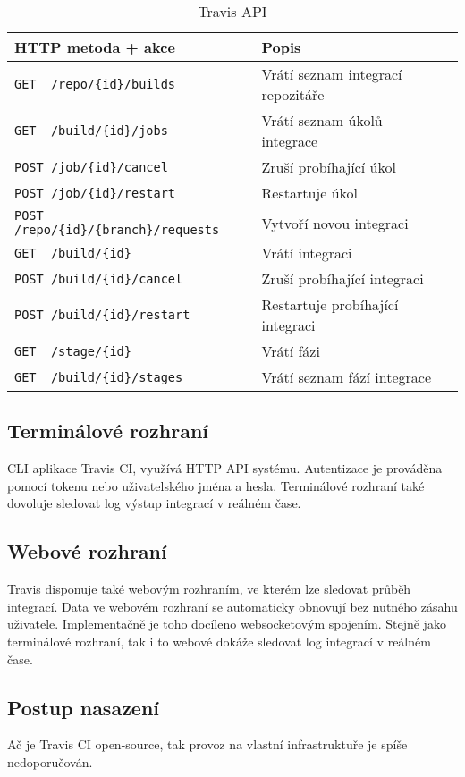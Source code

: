 \begin{table}[ht]
\centering
\fontsize{9.5}{11.5}\selectfont
\caption{Travis API}
\label{table:gitlab-api}
\begin{tabular}{|l|l|l|}
\hline
HTTP metoda + akce                                          & Popis \\ \hline
\verb|GET  /repo/{id}/builds|                               & Vrátí seznam integrací repozitáře      \\ \hline
\verb|GET  /build/{id}/jobs|                                & Vrátí seznam úkolů integrace      \\ \hline
\verb|POST /job/{id}/cancel|                                & Zruší probíhající úkol      \\ \hline
\verb|POST /job/{id}/restart|                               & Restartuje úkol      \\ \hline
\verb|POST /repo/{id}/{branch}/requests|                    & Vytvoří novou integraci      \\ \hline
\verb|GET  /build/{id}|                                     & Vrátí integraci      \\ \hline
\verb|POST /build/{id}/cancel|                              & Zruší probíhající integraci      \\ \hline
\verb|POST /build/{id}/restart|                             & Restartuje probíhající integraci      \\ \hline
\verb|GET  /stage/{id}|                                     & Vrátí fázi      \\ \hline
\verb|GET  /build/{id}/stages|                              & Vrátí seznam fází integrace      \\ \hline
\end{tabular}
\end{table}

\subsection{Terminálové rozhraní}

CLI aplikace Travis CI, využívá HTTP API systému.
Autentizace je prováděna pomocí tokenu nebo uživatelského jména a hesla.
Terminálové rozhraní také dovoluje sledovat log výstup integrací v reálném čase. 

\subsection{Webové rozhraní}

Travis disponuje také webovým rozhraním, ve kterém lze sledovat průběh integrací.
Data ve webovém rozhraní se automaticky obnovují bez nutného zásahu uživatele.
Implementačně je toho docíleno websocketovým spojením.
Stejně jako terminálové rozhraní, tak i to webové dokáže sledovat log integrací v reálném čase.

\subsection{Postup nasazení}

Ač je Travis CI open-source, tak provoz na vlastní infrastruktuře je spíše nedoporučován.
